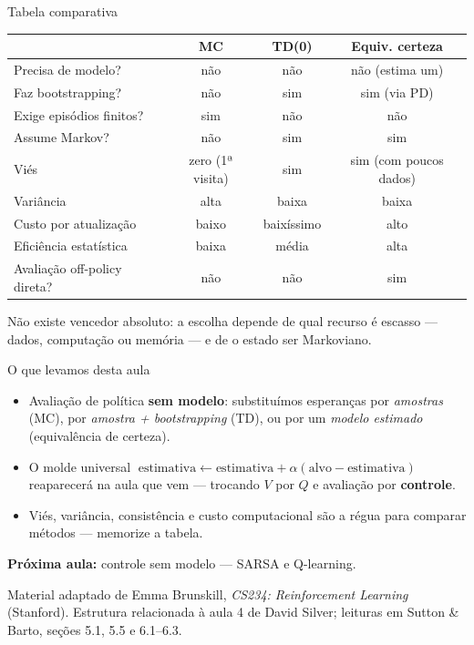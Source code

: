 \documentclass[aspectratio=169, 11pt]{beamer}
\begin{document}
\begin{frame}{Tabela comparativa}
  \centering
  \renewcommand{\arraystretch}{1.15}
  {\footnotesize
  \begin{tabular}{lccc}
    & \textbf{MC} & \textbf{TD(0)} & \textbf{Equiv. certeza}\\ \hline
    Precisa de modelo?            & não & não & não (estima um)\\
    Faz bootstrapping?            & não & sim & sim (via PD)\\
    Exige episódios finitos?      & sim & não & não\\
    Assume Markov?                & não & sim & sim\\
    Viés                          & zero (1ª visita) & sim & sim (com poucos dados)\\
    Variância                     & alta & baixa & baixa\\
    Custo por atualização         & baixo & baixíssimo & alto\\
    Eficiência estatística        & baixa & média & alta\\
    Avaliação off-policy direta?  & não & não & sim\\
  \end{tabular}}

  \smallskip
  \begin{alertabox}
    Não existe vencedor absoluto: a escolha depende de qual recurso é
    escasso — dados, computação ou memória — e de o estado ser Markoviano.
  \end{alertabox}
\end{frame}

\begin{frame}{O que levamos desta aula}
  \begin{itemize}
    \item Avaliação de política \textbf{sem modelo}: substituímos esperanças
      por \emph{amostras} (MC), por \emph{amostra + bootstrapping} (TD),
      ou por um \emph{modelo estimado} (equivalência de certeza).
    \item O molde universal
      $\;\text{estimativa} \leftarrow \text{estimativa}
        + \alpha(\text{alvo} - \text{estimativa})\;$
      reaparecerá na aula que vem — trocando $V$ por $Q$ e avaliação por
      \textbf{controle}.
    \item Viés, variância, consistência e custo computacional são a régua
      para comparar métodos — memorize a tabela.
  \end{itemize}

  \medskip
  \textbf{Próxima aula:} controle sem modelo — SARSA e Q-learning.

  \medskip
  {\small\color{rlCinza} Material adaptado de Emma Brunskill,
  \emph{CS234: Reinforcement Learning} (Stanford). Estrutura relacionada à
  aula 4 de David Silver; leituras em Sutton \& Barto,
  seções 5.1, 5.5 e 6.1–6.3.}
\end{frame}
\end{document}
